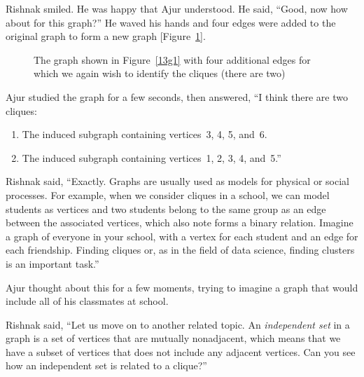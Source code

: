 Rishnak smiled. He was happy that Ajur understood. He said, ``Good, now how about for this graph?'' He waved his hands and four edges were added to the original graph to form a new graph [Figure~\ref{13g21}].

\begin{figure}
\begin{center}
\caption{The graph shown in Figure~\ref{13g1} with four additional edges for which we again wish to identify the cliques (there are two)}\label{13g21}
\end{center}
\end{figure}

Ajur studied the graph for a few seconds, then answered, ``I think there are two cliques:
\begin{enumerate}
    \item The induced subgraph containing vertices~3, 4, 5, and~6.
    \item The induced subgraph containing vertices~1, 2, 3, 4, and~5.''
\end{enumerate}

Rishnak said, ``Exactly. Graphs are usually used as models for physical or social processes. For example, when we consider cliques in a school, we can model students as vertices and two students belong to the same group as an edge between the associated vertices, which also note forms a binary relation. Imagine a graph of everyone in your school, with a vertex for each student and an edge for each friendship.  Finding cliques or, as in the field of data science, finding clusters is an important task.''

Ajur thought about this for a few moments, trying to imagine a graph that would include all of his classmates at school.

Rishnak said, ``Let us move on to another related topic. An \textit{independent set} in a graph is a set of vertices that are mutually nonadjacent, which means that we have a subset of vertices that does not include any adjacent vertices. Can you see how an independent set is related to a clique?''

